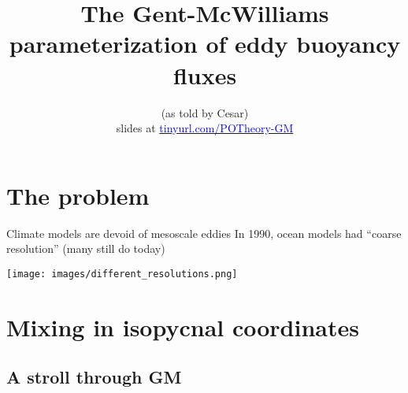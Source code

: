 \documentclass{beamer}
\begin{document}



\title[The Gent-McWilliams parameterization]{\LARGE{\bf The {\Huge Gent-McWilliams} parameterization
of  {\Huge eddy buoyancy fluxes}}}
\subtitle{}
\author[PO theory seminar, SIO, fall 2016]{(as told by Cesar)\\\vspace{.2cm} slides at
 \href{http://tinyurl.com/POTheory-GM}{\textcolor{blue}{tinyurl.com/POTheory-GM}} \vspace{-.25cm}}
\date{}

%
%

\frame{\titlepage}

%
%

\section{The problem}

\begin{frame}{Climate models are devoid of mesoscale eddies}
{In 1990, ocean models had ``coarse resolution'' (many still do today)}
\begin{center}
{\texttt{[image: images/different\_resolutions.png]}}
\end{center}
\end{frame}

\section{Mixing in isopycnal coordinates}

\subsection{A stroll through GM}
\end{document}
